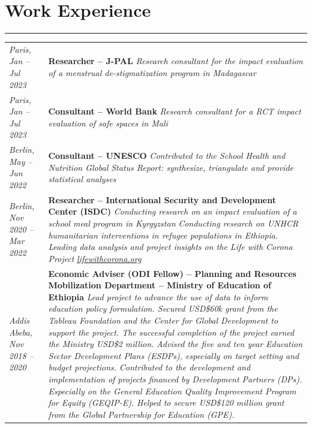 \documentclass[letterpaper]{article}
\begin{document}
\vspace{-0.15in}
\section*{\textbf{Work Experience} }
\hrule
\begin{tabular}{p{4cm} p{12cm}}
\textit{Paris, Jan -- Jul 2023} &  \textbf{Researcher -- J-PAL} \newline \textit{Research consultant for the impact evaluation of a menstrual de-stigmatization program in Madagascar } \\
\textit{Paris, Jan -- Jul 2023} &  \textbf{Consultant -- World Bank} \newline \textit{Research consultant for a RCT impact evaluation of safe spaces in Mali } \\
\textit{Berlin, May --Jun 2022} &  \textbf{Consultant -- UNESCO} \newline \textit{Contributed to the School Health and Nutrition Global Status Report: synthesize, triangulate and provide statistical analyses} \\
\textit{Berlin, Nov 2020 -- Mar 2022} & \textbf{Researcher -- International Security and Development Center (ISDC) } \newline  \textit{Conducting research on an impact evaluation of a school meal program in Kyrgyzstan }\newline \textit{Conducting research on UNHCR humanitarian interventions in refugee populations in Ethiopia.} \newline \textit{Leading data analysis and project insights on the Life with Corona Project} \href{lifewithcorona.org}{\textit{lifewithcorona.org}} \\
\textit{Addis Abeba, Nov 2018 -- 2020} & \textbf{Economic Adviser (ODI Fellow) -- Planning and Resources Mobilization Department --  Ministry of Education of Ethiopia} \newline \textit{Lead project to advance the use of data to inform education policy formulation. Secured USD\$60k grant from the Tableau Foundation and the Center for Global Development to support the project. The successful completion of the project earned the Ministry USD\$2 million. }\newline  \textit{Advised the five and ten year Education Sector Development Plans (ESDPs), especially on target setting and budget projections. }\newline   \textit{Contributed to the development and implementation of projects financed by Development Partners (DPs). Especially on the General Education Quality Improvement Program for Equity (GEQIP-E).} \newline \textit{Helped to secure USD\$120 million grant from the Global Partnership for Education (GPE).} \\

\end{tabular}
\end{document}
